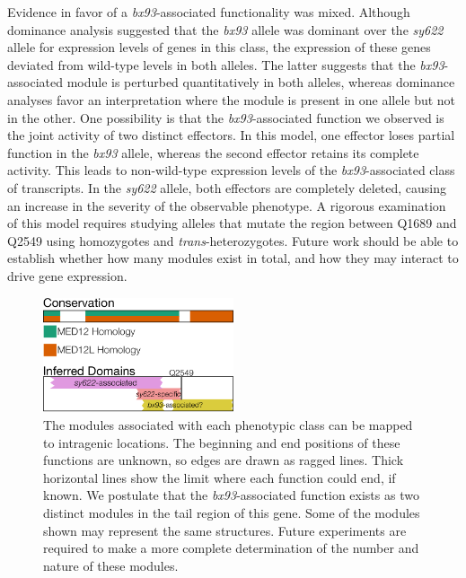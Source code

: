 \documentclass[10pt, twocolumn]{article}
\begin{document}
Evidence in favor of a \emph{bx93}-associated functionality was mixed. Although
dominance analysis suggested that the \emph{bx93} allele was dominant over the
\emph{sy622} allele for expression levels of genes in this class, the expression
of these genes deviated from wild-type levels in both alleles. The latter
suggests that the \emph{bx93}-associated module is perturbed quantitatively in
both alleles, whereas dominance analyses favor an interpretation where the module
is present in one allele but not in the other. One possibility is that the
\emph{bx93}-associated function we observed is the joint activity of two
distinct effectors. In this model, one effector loses partial function in the
\emph{bx93} allele, whereas the second effector retains its complete activity.
This leads to non-wild-type expression levels of the \emph{bx93}-associated
class of transcripts. In the \emph{sy622} allele, both effectors are completely
deleted, causing an increase in the severity of the observable phenotype. A
rigorous examination of this model requires studying alleles that mutate the
region between Q1689 and Q2549 using homozygotes and \emph{trans}-heterozygotes.
Future work should be able to establish whether how many modules exist in total,
and how they may interact to drive gene expression.

\begin{figure}
  \centering{}
  \includegraphics[width=0.5\textwidth]{../figs/inferred_domains.pdf}
  \caption{
    The modules associated with each phenotypic class can be
    mapped to intragenic locations. The beginning and end positions of
    these functions are unknown,
    so edges are drawn as ragged lines. Thick horizontal lines show the
    limit where each function could end, if known. We postulate that the
    \emph{bx93}-associated function exists as two distinct modules in the tail
    region of this gene. Some of the modules shown may represent the same
    structures. Future experiments are required to make a more complete
    determination of the number and nature of these modules.
  }
\label{fig:domains}
\end{figure}
\end{document}
